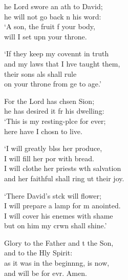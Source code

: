 \settowidth{\versewidth}{I will clothe her priests with salvation *}
\begin{psalmverse}%
  \begin{patverse}
he Lord swore an ath to David;\Med\\
    he will not go back n his word:\\
‘A son, the fruit f your body,\Med\\
    will I set upn your throne.

‘If they keep my covennt in truth\Med\\
    and my laws that I hve taught them,\\
their sons als shall rule\Med\\
    on your throne from ge to age.’

For the Lord has chsen Sion;\Med\\
    he has desired it fr his dwelling:\\
‘This is my resting-plce for ever;\Med\\
    here have I chosn to live.

‘I will greatly blss her produce,\Med\\
    I will fill her por with bread.\\
I will clothe her priests w\pointup{\i}th salvation\Med\\
    and her faithful shall ring ut their joy.

‘There David’s stck will flower;\Med\\
    I will prepare a lamp for m anointed.\\
I will cover his enem\pointup{\i}es with shame\Med\\
    but on him my crwn shall shine.’

Glory to the Father and t the Son,\Med\\
    and to the Hly Spirit:\\
as it was in the beginn\pointup{\i}ng, is now,\Med\\
    and will be for evr. Amen.
  \end{patverse}
\end{psalmverse}
